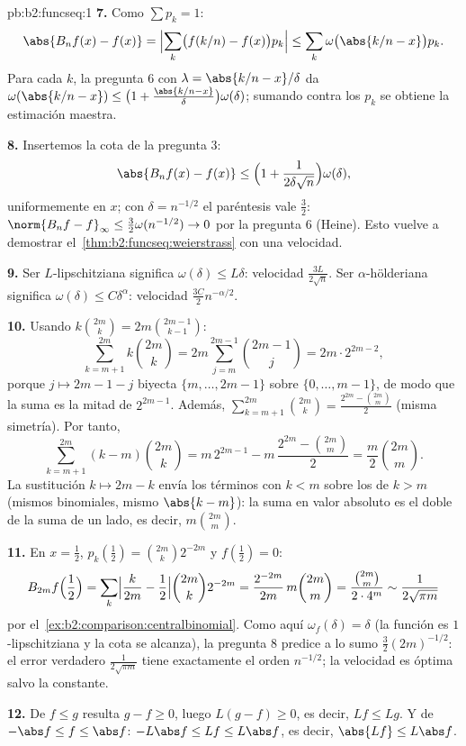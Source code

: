 \begin{solution}{pb:b2:funcseq:1}
\textbf{7.} Como $\sum p_k = 1$:
\[
\abs{B_nf(x) - f(x)}
= \Bigl|\sum_k\bigl(f(k/n) - f(x)\bigr)p_k\Bigr|
\leq \sum_k\omega\bigl(\abs{k/n - x}\bigr)p_k .
\]
Para cada $k$, la pregunta 6 con $\lambda = \abs{k/n - x}/\delta$
da $\omega(\abs{k/n-x}) \leq \bigl(1 +
\frac{\abs{k/n-x}}\delta\bigr)\omega(\delta)$; sumando contra los
$p_k$ se obtiene la estimación maestra.

\textbf{8.} Insertemos la cota de la pregunta 3:
\[
\abs{B_nf(x) - f(x)} \leq \Bigl(1 +
\frac{1}{2\delta\sqrt n}\Bigr)\omega(\delta),
\]
uniformemente en $x$; con $\delta = n^{-1/2}$ el paréntesis vale
$\frac32$: $\norm{B_nf - f}_\infty \leq \frac32\omega(n^{-1/2}) \to
0$ por la pregunta 6 (Heine). Esto vuelve a demostrar el~\cref{thm:b2:funcseq:weierstrass} con una velocidad.

\textbf{9.} Ser $L$-lipschitziana significa $\omega(\delta) \leq
L\delta$: velocidad $\frac{3L}{2\sqrt n}$. Ser $\alpha$-hölderiana
significa $\omega(\delta) \leq C\delta^\alpha$: velocidad
$\frac{3C}{2} n^{-\alpha/2}$.

\textbf{10.} Usando $k\binom{2m}k = 2m\binom{2m-1}{k-1}$:
\[
\sum_{k=m+1}^{2m}k\binom{2m}k
= 2m\sum_{j=m}^{2m-1}\binom{2m-1}{j}
= 2m\cdot 2^{2m-2},
\]
porque $j \mapsto 2m-1-j$ biyecta $\{m,\dots,2m-1\}$ sobre
$\{0,\dots,m-1\}$, de modo que la suma es la mitad de $2^{2m-1}$.
Además, $\sum_{k=m+1}^{2m}\binom{2m}k = \frac{2^{2m} -
\binom{2m}m}{2}$ (misma simetría). Por tanto,
\[
\sum_{k=m+1}^{2m}(k-m)\binom{2m}k
= m\,2^{2m-1} - m\,\frac{2^{2m} - \binom{2m}m}{2}
= \frac m2\binom{2m}m .
\]
La sustitución $k \mapsto 2m-k$ envía los términos con $k < m$
sobre los de $k > m$ (mismos binomiales, mismo $\abs{k-m}$): la
suma en valor absoluto es el doble de la suma de un lado, es decir,
$m\binom{2m}m$.

\textbf{11.} En $x = \frac12$, $p_k(\tfrac12) = \binom{2m}k2^{-2m}$
y $f(\tfrac12) = 0$:
\[
B_{2m}f\Bigl(\frac12\Bigr)
= \sum_k\Bigl|\frac{k}{2m} - \frac12\Bigr|
\binom{2m}k 2^{-2m}
= \frac{2^{-2m}}{2m}\,m\binom{2m}m
= \frac{\binom{2m}m}{2\cdot4^m}
\sim \frac{1}{2\sqrt{\pi m}}
\]
por el~\cref{ex:b2:comparison:centralbinomial}. Como aquí
$\omega_f(\delta) = \delta$ (la función es $1$-lipschitziana y la
cota se alcanza), la pregunta 8 predice a lo sumo
$\frac32(2m)^{-1/2}$: el error verdadero $\frac{1}{2\sqrt{\pi m}}$
tiene exactamente el orden $n^{-1/2}$; la velocidad es óptima salvo
la constante.

\textbf{12.} De $f \leq g$ resulta $g - f \geq 0$, luego $L(g-f)
\geq 0$, es decir, $Lf \leq Lg$. Y de $-\abs f \leq f \leq \abs f$:
$-L\abs f \leq Lf \leq L\abs f$, es decir, $\abs{Lf} \leq L\abs f$.


\end{solution}
